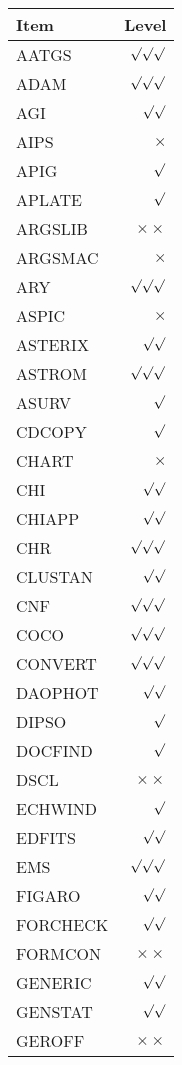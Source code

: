 \newpage
\twocolumn
\small
\begin{center}
\begin{tabular}{||l|r||}
\hline
 Item & Level \\
\hline
\hline
AATGS     & $\surd\surd\surd$ \\
ADAM      & $\surd\surd\surd$ \\
AGI       & $\surd\surd$ \\
AIPS      & $\times$ \\
APIG      & $\surd$ \\
APLATE    & $\surd$ \\
ARGSLIB   & $\times\times$ \\
ARGSMAC   & $\times$\\
ARY       & $\surd\surd\surd$ \\
ASPIC     & $\times$ \\
ASTERIX   & $\surd\surd$ \\
ASTROM    & $\surd\surd\surd$ \\
ASURV     & $\surd$ \\
CDCOPY    & $\surd$ \\
CHART     & $\times$ \\
CHI       & $\surd\surd$ \\
CHIAPP    & $\surd\surd$ \\
CHR       & $\surd\surd\surd$ \\
CLUSTAN   & $\surd\surd$ \\
CNF       & $\surd\surd\surd$ \\
COCO      & $\surd\surd\surd$ \\
CONVERT   & $\surd\surd\surd$ \\
DAOPHOT   & $\surd\surd$ \\
DIPSO     & $\surd$ \\
DOCFIND   & $\surd$ \\
DSCL      & $\times\times$ \\
ECHWIND   & $\surd$ \\
EDFITS    & $\surd\surd$ \\
EMS       & $\surd\surd\surd$ \\
FIGARO    & $\surd\surd$ \\
FORCHECK  & $\surd\surd$ \\
FORMCON   & $\times\times$ \\
GENERIC   & $\surd\surd$ \\
GENSTAT   & $\surd\surd$ \\
GEROFF    & $\times\times$ \\

\end{tabular}
\end{center}
